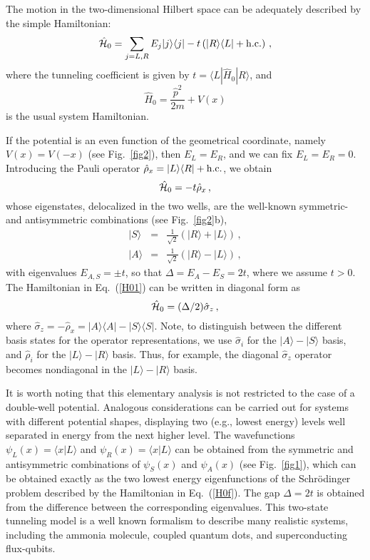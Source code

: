 \documentclass[aps,pra,reprint, superscriptaddress,amsmath,showpacs,longbibliography]{revtex4-2}
\newcommand{\ket}[1]{|#1\rangle}
\newcommand{\figref}[1]{\mbox{Fig.~\ref{#1}}}
\renewcommand{\eqref}[1]{\mbox{Eq.~(\ref{#1})}}
\newcommand{\be}{\begin{equation}}
\newcommand{\ee}{\end{equation}}
\newcommand{\bea}{\begin{eqnarray}}
\newcommand{\eea}{\end{eqnarray}}
\begin{document}
The motion in the two-dimensional Hilbert space can be adequately described by the simple Hamiltonian:
\be \label{H01}
\hat {\cal H}_0 =   \sum_{j= L,R} E_j | j \rangle \langle j  | - t \left( |R \rangle \langle L |+ {\rm h. c.}  \right)\, ,
\ee
where the tunneling coefficient is given by $t = \langle L | \hat H_0 | R \rangle$, and
\be\label{H0f}
\hat H_0 = \frac{\hat p^2}{2m} + V(x) 
\ee
is the usual system Hamiltonian.

If the potential is an even function of the geometrical coordinate, namely $V(x) = V(-x)$ (see \figref{fig2}), then  $E_L = E_R$, and we can fix $E_L = E_R = 0$. Introducing the  Pauli operator 
 $\hat \rho_x = |L \rangle \langle R |+ {\rm h.c.}$, we {obtain}
\be\label{H02}
\hat {\cal H}_0 = -t \hat \rho_x\, ,
\ee
whose eigenstates, delocalized in the two wells, are the well-known symmetric- and antisymmetric combinations (see \figref{fig2}b),
\bea\label{SA}
| S  \rangle &=& \frac{1}{\sqrt{2}} \left( |R \rangle + | L \rangle \right)\, , \nonumber \\
| A \rangle &=& \frac{1}{\sqrt{2}} \left (|R \rangle - |L\rangle \right)\, ,
\eea
with eigenvalues $E_{A,S} = \pm t$, so that $\Delta = E_A - E_S = 2t$, where we {assume} $t>0$.
The Hamiltonian in \eqref{H01} can be written in diagonal form as
\be \hat {\cal H}_0 = (\Delta/2) \hat \sigma_z\, ,
\ee
where $\hat \sigma_z = - \hat \rho_x = |A \rangle \langle A| - |S \rangle \langle S|$.
{Note, to distinguish between the different basis states for the operator representations,
we  use $\hat \sigma_i$
for the $\ket{A}{-}\ket{S}$ basis,
and $\hat \rho_i$ for the
$\ket{L}{-}\ket{R}$ basis.
Thus, for example, the diagonal $\hat \sigma_z$
operator becomes nondiagonal
in the $\ket{L}{-}\ket{R}$ basis.
}


It is worth noting that this elementary analysis is not restricted to the case of a double-well potential. Analogous considerations can be carried out for systems with different potential shapes, displaying two (e.g., lowest energy) levels well separated in energy from the next higher level.
The wavefunctions $\psi_L(x) = \langle x |L \rangle$ and $\psi_R(x) = \langle x |L \rangle$ can be obtained from the symmetric and antisymmetric combinations of $\psi_S(x)$ and $\psi_A(x)$ (see \figref{fig1}), which can be obtained exactly as the two lowest energy eigenfunctions of the  Schr\"{o}dinger problem described by the Hamiltonian in \eqref{H0f}. The gap $\Delta = 2 t$ is obtained from the difference between the corresponding eigenvalues.
This two-state tunneling model is a well known formalism
to describe many realistic systems,
including the ammonia molecule, coupled quantum dots, and superconducting flux-qubits.
\end{document}
